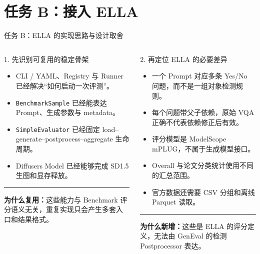 \documentclass[aspectratio=169,10pt]{beamer}
\begin{document}
\section{任务 B：接入 ELLA}
\begin{frame}{任务 B：ELLA 的实现思路与设计取舍}
  \begin{columns}[T,onlytextwidth]
      \begin{block}{1. 先识别可复用的稳定骨架}
        \begin{minipage}[c][5.05cm][c]{\linewidth}
          \begin{itemize}\scriptsize
            \item CLI / YAML、Registry 与 Runner 已经解决“如何启动一次评测”。
            \item \texttt{BenchmarkSample} 已经能表达 Prompt、生成参数与 metadata。
            \item \texttt{SimpleEvaluator} 已经固定 load--generate--postprocess--aggregate 生命周期。
            \item Diffusers Model 已经能够完成 SD1.5 生图和显存释放。
          \end{itemize}
          \vspace{0.45em}
          \color{T2IGray}\rule{\linewidth}{0.35pt}\par\vspace{0.3em}
          \scriptsize\textbf{为什么复用：}这些能力与 Benchmark 评分语义无关，重复实现只会产生多套入口和结果格式。
        \end{minipage}
      \end{block}

      \begin{block}{2. 再定位 ELLA 的必要差异}
        \begin{minipage}[c][5.05cm][c]{\linewidth}
          \begin{itemize}\scriptsize
            \item 一个 Prompt 对应多条 Yes/No 问题，而不是一组对象检测规则。
            \item 每个问题带父子依赖，原始 VQA 正确不代表依赖修正后有效。
            \item 评分模型是 ModelScope mPLUG，不属于生成模型接口。
            \item Overall 与论文分类统计使用不同的汇总范围。
            \item 官方数据还需要 CSV 分组和离线 Parquet 读取。
          \end{itemize}
          \vspace{0.45em}
          \color{T2IGray}\rule{\linewidth}{0.35pt}\par\vspace{0.3em}
          \scriptsize\textbf{为什么新增：}这些是 ELLA 的评分定义，无法由 GenEval 的检测 Postprocessor 表达。
        \end{minipage}
      \end{block}


\end{columns}
\end{frame}
\end{document}
